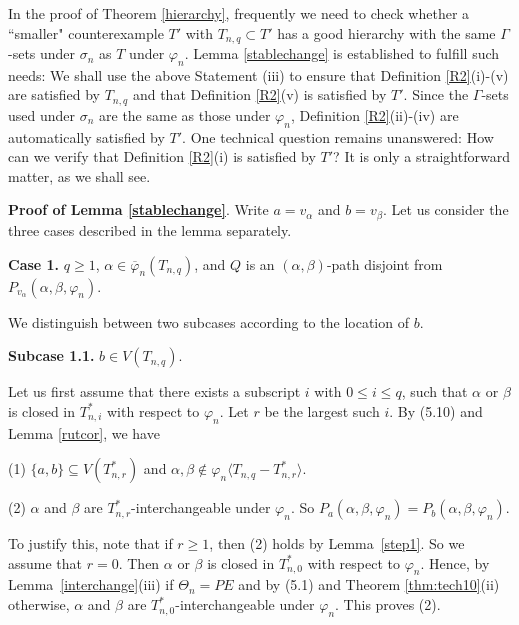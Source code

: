 \documentclass[11pt]{article}
\newcommand{\phibar}{\overline{\varphi}}
\begin{document}
 In the proof of Theorem \ref{hierarchy}, frequently we need to check whether a ``smaller" 
counterexample $T'$ with $T_{n,q} \subset T'$ has a good hierarchy with the same $\Gamma$-sets under $\sigma_n$ as 
$T$ under $\varphi_n$. Lemma \ref{stablechange} is established to fulfill such needs: We shall use the above Statement 
(iii) to ensure that Definition \ref{R2}(i)-(v) are satisfied by $T_{n,q}$ and that Definition \ref{R2}(v) is satisfied by 
$T'$. Since the $\Gamma$-sets used under $\sigma_n$ are the same as those under $\varphi_n$, Definition \ref{R2}(ii)-(iv) 
are automatically satisfied by $T'$. One technical question remains unanswered: How can we verify that Definition 
\ref{R2}(i) is satisfied by $T'$?  It is only a straightforward matter, as we shall see.

\vskip 3mm  

{\bf Proof of Lemma \ref{stablechange}}. 	Write $a=v_{\alpha}$ and $b=v_{\beta}$. Let us consider the three cases 
described in the lemma separately.

{\bf Case 1.} $q\geq 1$, $\alpha\in\phibar_n(T_{n,q})$, and $Q$ is an $(\alpha,\beta)$-path disjoint from $P_{v_{\alpha}}(\alpha,\beta,\varphi_n)$. 

We distinguish between two subcases according to the location of $b$.

{\bf Subcase 1.1.} $b \in V(T_{n,q})$.  

Let us first assume that there exists a subscript $i$ with $0\le i \le q$, such that $\alpha$ or $\beta$ is closed 
in $T^*_{n,i}$ with respect to $\varphi_n$. Let $r$ be the largest such $i$. By (5.10) and Lemma \ref{rutcor}, we have

(1) $\{a, b\} \subseteq V(T_{n,r}^*)$ and $\alpha, \beta \notin \varphi_n \langle T_{n,q}- T_{n,r}^* \rangle$. 

(2) $\alpha$ and $\beta$ are $T_{n,r}^*$-interchangeable under $\varphi_n$. So $P_a(\alpha,\beta,
\varphi_n)=P_b(\alpha,\beta,\varphi_n)$. 

To justify this, note that if $r \geq 1$, then (2) holds by Lemma~\ref{step1}. So we assume that $r=0$. 
Then $\alpha$ or $\beta$ is closed in $T_{n,0}^*$ with respect to $\varphi_n$.  Hence, by Lemma~\ref{interchange}(iii) 
if $\Theta_n= PE$ and by (5.1) and Theorem \ref{thm:tech10}(ii) otherwise, $\alpha$ and $\beta$ are $T_{n,0}^*$-interchangeable 
under $\varphi_n$. This proves (2). 
\end{document}
